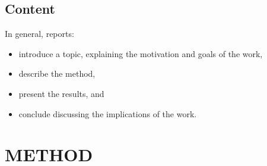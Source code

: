 \documentclass[11pt,a4paper]{article}
\begin{document}
\subsection{Content}
In general, reports:

\begin{itemize}
\item introduce a topic, explaining the motivation and goals of the work, 
\item describe the method, 
\item  present the results, and
\item conclude discussing the implications of the work.
\end{itemize}

\section{METHOD}
\end{document}
